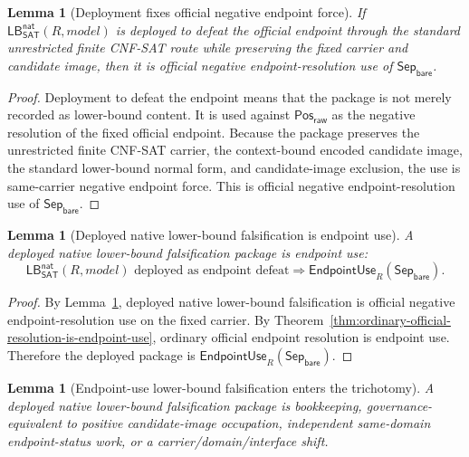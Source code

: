\documentclass[11pt]{article}
\newtheorem{lemma}[theorem]{Lemma}
\theoremstyle{definition}
\theoremstyle{remark}
\newcommand{\PosRaw}{\mathsf{Pos}_{\mathsf{raw}}}
\newcommand{\SepBare}{\mathsf{Sep}_{\mathsf{bare}}}
\newcommand{\EndpointUse}{\mathsf{EndpointUse}}
\newcommand{\LBNatSAT}{\mathsf{LB}^{\mathsf{nat}}_{\mathsf{SAT}}}
\begin{document}
\begin{lemma}[Deployment fixes official negative endpoint force]\label{lem:deployed-native-lb-official-negative-force}
If \(\LBNatSAT(R,model)\) is deployed to defeat the official endpoint through the standard unrestricted finite CNF-SAT route while preserving the fixed carrier and candidate image, then it is official negative endpoint-resolution use of \(\SepBare\).
\end{lemma}

\begin{proof}
Deployment to defeat the endpoint means that the package is not merely recorded as lower-bound content. It is used against \(\PosRaw\) as the negative resolution of the fixed official endpoint. Because the package preserves the unrestricted finite CNF-SAT carrier, the context-bound encoded candidate image, the standard lower-bound normal form, and candidate-image exclusion, the use is same-carrier negative endpoint force. This is official negative endpoint-resolution use of \(\SepBare\).
\end{proof}

\begin{lemma}[Deployed native lower-bound falsification is endpoint use]\label{lem:deployed-native-lb-endpoint-use}
A deployed native lower-bound falsification package is endpoint use:
\[
  \LBNatSAT(R,model)\text{ deployed as endpoint defeat}
  \Rightarrow \EndpointUse_R(\SepBare).
\]
\end{lemma}

\begin{proof}
By Lemma~\ref{lem:deployed-native-lb-official-negative-force}, deployed native lower-bound falsification is official negative endpoint-resolution use on the fixed carrier. By Theorem~\ref{thm:ordinary-official-resolution-is-endpoint-use}, ordinary official endpoint resolution is endpoint use. Therefore the deployed package is \(\EndpointUse_R(\SepBare)\).
\end{proof}

\begin{lemma}[Endpoint-use lower-bound falsification enters the trichotomy]\label{lem:endpoint-use-lb-enters-trichotomy}
A deployed native lower-bound falsification package is bookkeeping, governance-equivalent to positive candidate-image occupation, independent same-domain endpoint-status work, or a carrier/domain/interface shift.
\end{lemma}
\end{document}

